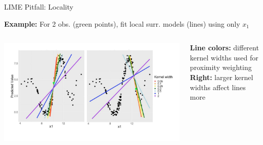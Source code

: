 \documentclass[10pt,compress,t,notes=noshow, xcolor=table]{beamer}
\begin{document}
\begin{frame}{LIME Pitfall: Locality}
\begin{itemize}
     \end{itemize}
     \pause
     \textbf{Example:} For 2 obs. (green points), fit local surr. models (lines) using only \( x_1 \)
     \begin{columns}[T, totalwidth=\textwidth]
        \begin{column}{0.72\textwidth}
        \includegraphics[width=\textwidth, trim = 25px 0px 15px 40px, clip]{figure/lime_locality}
         \end{column}
         \begin{column}{0.31\textwidth}
    \lz
  \textbf{Line colors:} different kernel widths used for proximity weighting\\
  \lz
  \textbf{Right:} larger kernel widths affect lines more

         \end{column}
     \end{columns}
\end{frame}
\end{document}
